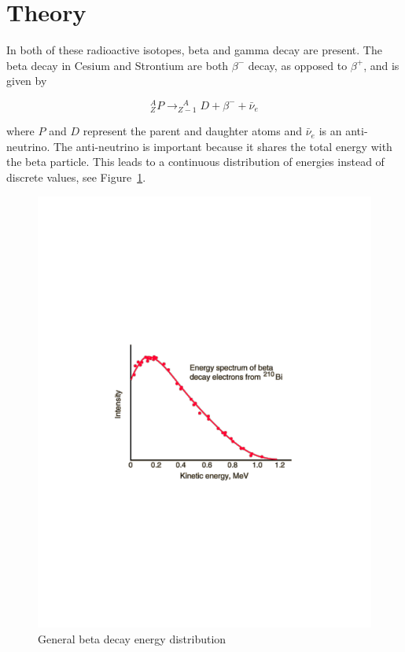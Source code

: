 \section{Theory} 

\label{sec:theory} In both of these radioactive isotopes, beta and gamma decay are present. The beta decay in Cesium and Strontium are both $\beta^-$ decay, as opposed to $\beta^+$, and is given by 

\begin{equation}
	^{A}_{Z}P \to _{Z-1}^{~~~A}D + \beta^- + \bar{\nu}_e \nonumber 
\end{equation}%

where $P$ and $D$ represent the parent and daughter atoms and $ \bar{\nu}_e$ is an anti-neutrino. The anti-neutrino is important because it shares the total energy with the beta particle. This leads to a continuous distribution of energies instead of discrete values, see Figure~\ref{fig:Figures_betabi210}.

\begin{figure}
	[bp] \centering 
	\includegraphics[width=.5
	\textwidth]{./Figures/betabi210.pdf} \caption{General beta decay energy distribution\cite{Neary28031940}} \label{fig:Figures_betabi210} 
\end{figure}%

